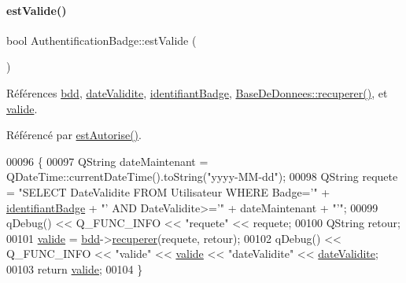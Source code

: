 \paragraph{\texorpdfstring{est\+Valide()}{estValide()}}
{\footnotesize\ttfamily bool Authentification\+Badge\+::est\+Valide (\begin{DoxyParamCaption}{ }\end{DoxyParamCaption})}



Références \hyperlink{class_authentification_badge_a0b9c724c5bc25bf1f87443d7e6833398}{bdd}, \hyperlink{class_authentification_badge_a3ff41c56490c3cfd0322949be2338605}{date\+Validite}, \hyperlink{class_authentification_badge_a7120366168cbe21efd991a978922eb20}{identifiant\+Badge}, \hyperlink{class_base_de_donnees_a77539baad389f5acf754cd2cd452403e}{Base\+De\+Donnees\+::recuperer()}, et \hyperlink{class_authentification_badge_a9d0df9da3663b065a3a6a7a1f37a0a69}{valide}.



Référencé par \hyperlink{class_authentification_badge_aceb9c5a09dddbff73cd02973913c79c1}{est\+Autorise()}.


\begin{DoxyCode}
00096 \{    
00097     QString dateMaintenant = QDateTime::currentDateTime().toString(\textcolor{stringliteral}{"yyyy-MM-dd"});
00098     QString requete = \textcolor{stringliteral}{"SELECT DateValidite FROM Utilisateur WHERE Badge='"} + 
      \hyperlink{class_authentification_badge_a7120366168cbe21efd991a978922eb20}{identifiantBadge} + \textcolor{stringliteral}{"' AND DateValidite>='"} + dateMaintenant + \textcolor{stringliteral}{"'"};
00099     qDebug() << Q\_FUNC\_INFO << \textcolor{stringliteral}{"requete"} << requete;
00100     QString retour;
00101     \hyperlink{class_authentification_badge_a9d0df9da3663b065a3a6a7a1f37a0a69}{valide} = \hyperlink{class_authentification_badge_a0b9c724c5bc25bf1f87443d7e6833398}{bdd}->\hyperlink{class_base_de_donnees_a77539baad389f5acf754cd2cd452403e}{recuperer}(requete, retour);
00102     qDebug() << Q\_FUNC\_INFO << \textcolor{stringliteral}{"valide"} << \hyperlink{class_authentification_badge_a9d0df9da3663b065a3a6a7a1f37a0a69}{valide} << \textcolor{stringliteral}{"dateValidite"} << 
      \hyperlink{class_authentification_badge_a3ff41c56490c3cfd0322949be2338605}{dateValidite};
00103     \textcolor{keywordflow}{return} \hyperlink{class_authentification_badge_a9d0df9da3663b065a3a6a7a1f37a0a69}{valide};
00104 \}
\end{DoxyCode}
\mbox{\label{class_authentification_badge_a76f7b9a424aeec947813c6858ff945a3}} 
